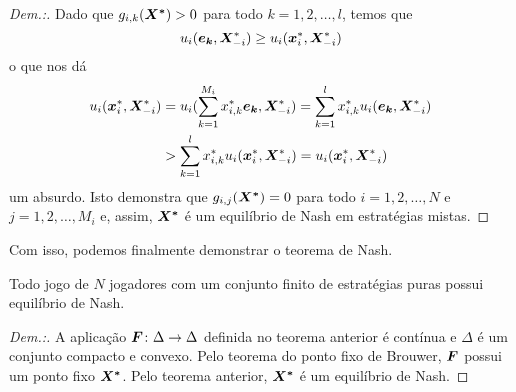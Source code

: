 \begin{proof}[Dem.:]
    Dado que $g_{i,k}(\boldsymbol{X^*})>0$ para todo $k=1,2,\dots,l$, temos que
    \begin{equation}
        u_i(\boldsymbol{e_k},\boldsymbol{X}^*_{-i})\geq u_i(\boldsymbol{x}^*_i,\boldsymbol{X}^*_{-i})
    \end{equation}
    o que nos dá
    \begin{equation}
    \begin{split}
        u_i(\boldsymbol{x}^*_i,\boldsymbol{X}^*_{-i}) &= u_i(\sum_{k=1}^{M_i}x_{i,k}^* \boldsymbol{e_k},\boldsymbol{X}^*_{-i}) = \sum_{k=1}^{l}x_{i,k}^* u_i(\boldsymbol{e_k},\boldsymbol{X}^*_{-i}) \\
        &> \sum_{k=1}^{l}x_{i,k}^* u_i(\boldsymbol{x}^*_i,\boldsymbol{X}^*_{-i}) = u_i(\boldsymbol{x}^*_i,\boldsymbol{X}^*_{-i})
    \end{split}
    \end{equation}
    um absurdo. Isto demonstra que $g_{i,j}(\boldsymbol{X^*})=0$ para todo $i=1,2,\dots,N$ e $j=1,2,\dots,M_i$ e, assim, $\boldsymbol{X^*}$ é um equilíbrio de Nash em estratégias mistas.
\end{proof}

Com isso, podemos finalmente demonstrar o teorema de Nash.

\begin{theorem}
    Todo jogo de $N$ jogadores com um conjunto finito de estratégias puras possui equilíbrio de Nash.
\end{theorem}
\begin{proof}[Dem.:]
    A aplicação $\boldsymbol{F} \colon \Delta \to \Delta$ definida no teorema anterior é contínua e $\Delta$ é um conjunto compacto e convexo. Pelo teorema do ponto fixo de Brouwer, $\boldsymbol{F}$ possui um ponto fixo $\boldsymbol{X^*}$. Pelo teorema anterior, $\boldsymbol{X^*}$ é um equilíbrio de Nash.
\end{proof}

